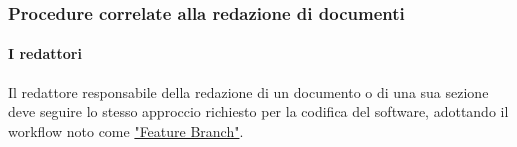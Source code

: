 

\subsubsection{Procedure correlate alla redazione di documenti}

\paragraph{I redattori}
Il redattore responsabile della redazione di un documento o di una sua sezione deve seguire lo stesso approccio richiesto per la codifica del software, adottando il workflow noto come \href{https://www.atlassian.com/git/tutorials/comparing-workflows/feature-branch-workflow}{"Feature Branch"}. \\

